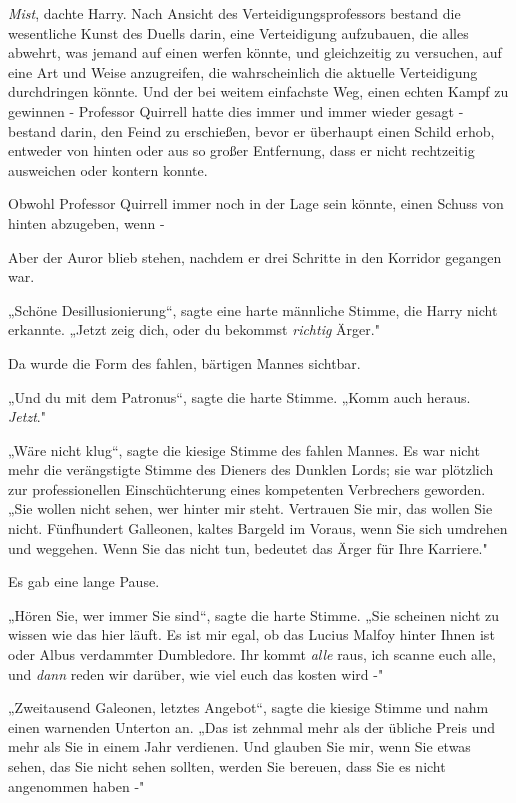 {\emph{Mist}, dachte Harry. Nach Ansicht des Verteidigungsprofessors bestand die wesentliche Kunst des Duells darin, eine Verteidigung aufzubauen, die alles abwehrt, was jemand auf einen werfen könnte, und gleichzeitig zu versuchen, auf eine Art und Weise anzugreifen, die wahrscheinlich die aktuelle Verteidigung durchdringen könnte. Und der bei weitem einfachste Weg, einen echten Kampf zu gewinnen - Professor Quirrell hatte dies immer und immer wieder gesagt - bestand darin, den Feind zu erschießen, bevor er überhaupt einen Schild erhob, entweder von hinten oder aus so großer Entfernung, dass er nicht rechtzeitig ausweichen oder kontern konnte.

Obwohl Professor Quirrell immer noch in der Lage sein könnte, einen Schuss von hinten abzugeben, wenn -

Aber der Auror blieb stehen, nachdem er drei Schritte in den Korridor gegangen war.

„Schöne Desillusionierung“, sagte eine harte männliche Stimme, die Harry nicht erkannte. „Jetzt zeig dich, oder du bekommst \emph{richtig} Ärger."

Da wurde die Form des fahlen, bärtigen Mannes sichtbar.

„Und du mit dem Patronus“, sagte die harte Stimme. „Komm auch heraus. \emph{Jetzt}."

„Wäre nicht klug“, sagte die kiesige Stimme des fahlen Mannes. Es war nicht mehr die verängstigte Stimme des Dieners des Dunklen Lords; sie war plötzlich zur professionellen Einschüchterung eines kompetenten Verbrechers geworden. „Sie wollen nicht sehen, wer hinter mir steht. Vertrauen Sie mir, das wollen Sie nicht. Fünfhundert Galleonen, kaltes Bargeld im Voraus, wenn Sie sich umdrehen und weggehen. Wenn Sie das nicht tun, bedeutet das Ärger für Ihre Karriere."

Es gab eine lange Pause.

„Hören Sie, wer immer Sie sind“, sagte die harte Stimme. „Sie scheinen nicht zu wissen wie das hier läuft. Es ist mir egal, ob das Lucius Malfoy hinter Ihnen ist oder Albus verdammter Dumbledore. Ihr kommt \emph{alle} raus, ich scanne euch alle, und \emph{dann} reden wir darüber, wie viel euch das kosten wird -"

„Zweitausend Galeonen, letztes Angebot“, sagte die kiesige Stimme und nahm einen warnenden Unterton an. „Das ist zehnmal mehr als der übliche Preis und mehr als Sie in einem Jahr verdienen. Und glauben Sie mir, wenn Sie etwas sehen, das Sie nicht sehen sollten, werden Sie bereuen, dass Sie es nicht angenommen haben -"

}
